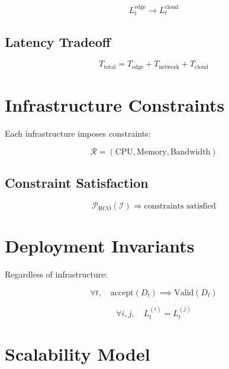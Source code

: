 \begin{equation}
L_t^{\text{edge}} \rightarrow L_t^{\text{cloud}}
\end{equation}

\subsection{Latency Tradeoff}

\begin{equation}
T_{\text{total}} = T_{\text{edge}} + T_{\text{network}} + T_{\text{cloud}}
\end{equation}

\section{Infrastructure Constraints}

Each infrastructure imposes constraints:

\begin{equation}
\mathcal{R} = (\text{CPU}, \text{Memory}, \text{Bandwidth})
\end{equation}

\subsection{Constraint Satisfaction}

\begin{equation}
\mathcal{P}_{\text{RCO}}(\mathcal{I}) \Rightarrow \text{constraints satisfied}
\end{equation}

\section{Deployment Invariants}

Regardless of infrastructure:

\begin{equation}
\forall t, \quad \text{accept}(D_t) \implies \text{Valid}(D_t)
\end{equation}

\begin{equation}
\forall i,j, \quad L_t^{(i)} = L_t^{(j)}
\end{equation}

\section{Scalability Model}


